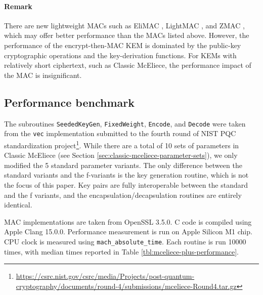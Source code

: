 \documentclass[runningheads]{llncs}
\begin{document}
\paragraph{Remark} There are new lightweight MACs such as EliMAC \cite{DBLP:journals/tosc/DobraunigMN23}, LightMAC \cite{DBLP:conf/fse/LuykxPTY16}, and ZMAC \cite{DBLP:conf/crypto/IwataMPS17}, which may offer better performance than the MACs listed above. However, the performance of the encrypt-then-MAC KEM is dominated by the public-key cryptographic operations and the key-derivation functions. For KEMs with relatively short ciphertext, such as Classic McEliece, the performance impact of the MAC is insignificant.

\subsection{Performance benchmark}
The subroutines \texttt{SeededKeyGen}, \texttt{FixedWeight}, \texttt{Encode}, and \texttt{Decode} were taken from the \texttt{vec} implementation submitted to the fourth round of NIST PQC standardization project\footnote{\url{https://csrc.nist.gov/csrc/media/Projects/post-quantum-cryptography/documents/round-4/submissions/mceliece-Round4.tar.gz}}. While there are a total of 10 sets of parameters in Classic McEliece (see Section \ref{sec:classic-mceliece-parameter-sets}), we only modified the 5 standard parameter variants. The only difference between the standard variants and the f-variants is the key generation routine, which is not the focus of this paper. Key pairs are fully interoperable between the standard and the f variants, and the encapsulation/decapsulation routines are entirely identical.

MAC implementations are taken from OpenSSL 3.5.0. C code is compiled using Apple Clang 15.0.0. Performance measurement is run on Apple Silicon M1 chip. CPU clock is measured using \texttt{mach\_absolute\_time}. Each routine is run 10000 times, with median times reported in Table \ref{tbl:mceliece-plus-performance}.
\end{document}
